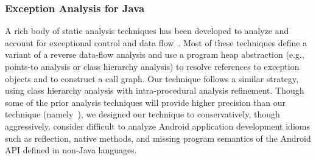 \vspace{-0.05in}
\subsubsection{Exception Analysis for Java}  A rich body of static analysis
techniques has been developed to analyze and account for exceptional
control and data
flow~\cite{Byeong-MoChang2002,Chang2001,Fu2005,Fu2007,Jo2004,Qiu2010,Kastrinis2013}.
Most of these techniques define a variant of a reverse data-flow
analysis and use a program heap abstraction (e.g., points-to
analysis or class hierarchy analysis) to resolve references to
exception objects and to construct a call graph. Our technique follows
a similar strategy, using class hierarchy analysis with
intra-procedural analysis refinement.  Though some of the prior
analysis techniques will provide higher precision than our technique
(namely~\cite{Fu2005,Fu2007,Qiu2010}), we designed our technique to
conservatively, though aggressively, consider difficult to analyze
Android application development idioms such as reflection, native
methods, and missing program semantics of the Android API defined in
non-Java languages.  
